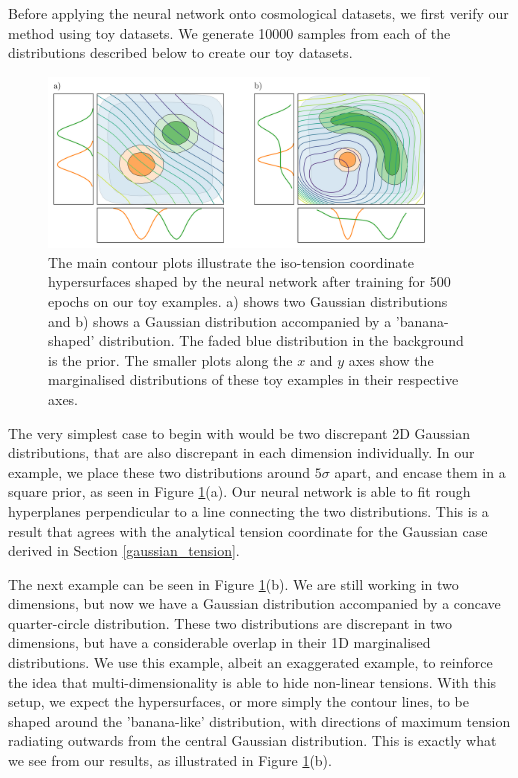 \documentclass[%
 reprint,
 amsmath,amssymb,
 aps,
]{revtex4-2}
\begin{document}
Before applying the neural network onto cosmological datasets, we first verify our method using toy datasets. We generate 10000 samples from each of the distributions described below to create our toy datasets.

\begin{figure}
    \includegraphics[width=0.9\textwidth]{../plots/toy_wide.png}
    \centering
    \caption{The main contour plots illustrate the iso-tension coordinate hypersurfaces shaped by the neural network after training for 500 epochs on our toy examples. a) shows two Gaussian distributions and b) shows a Gaussian distribution accompanied by a 'banana-shaped' distribution. The faded blue distribution in the background is the prior. The smaller plots along the $x$ and $y$ axes show the marginalised distributions of these toy examples in their respective axes.}
    \label{fig:toy}
\end{figure}

The very simplest case to begin with would be two discrepant 2D Gaussian distributions, that are also discrepant in each dimension individually. In our example, we place these two distributions around $5\sigma$ apart, and encase them in a square prior, as seen in Figure \ref{fig:toy}(a).  Our neural network is able to fit rough hyperplanes perpendicular to a line connecting the two distributions. This is a result that agrees with the analytical tension coordinate for the Gaussian case derived in Section \ref{gaussian_tension}.

The next example can be seen in Figure \ref{fig:toy}(b). We are still working in two dimensions, but now we have a Gaussian distribution accompanied by a concave quarter-circle distribution. These two distributions are discrepant in two dimensions, but have a considerable overlap in their 1D marginalised distributions. We use this example, albeit an exaggerated example, to reinforce the idea that multi-dimensionality is able to hide non-linear tensions. With this setup, we expect the hypersurfaces, or more simply the contour lines, to be shaped around the 'banana-like' distribution, with directions of maximum tension radiating outwards from the central Gaussian distribution. This is exactly what we see from our results, as illustrated in Figure \ref{fig:toy}(b).
\end{document}
